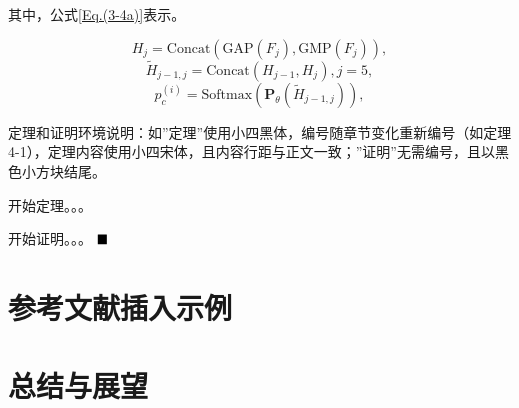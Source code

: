 其中，公式\ref{Eq.(3-4a)}表示。

\begin{equation}
	H_{j}= \mathrm{Concat}(\mathrm{GAP}({F}_{j}),\mathrm{GMP}({F}_{j})),
\end{equation}
\begin{equation}
	\tilde{H}_{j-1,j}= \mathrm{Concat}(H_{j-1},H_{j}),j=5,
\end{equation}
\begin{equation}
	p_c^{(i)}=\mathrm{Softmax}(\boldsymbol{P}_\theta(\tilde{H}_{j-1,j})),
\end{equation}

定理和证明环境说明：如”定理”使用小四黑体，编号随章节变化重新编号（如定理4-1），定理内容使用小四宋体，且内容行距与正文一致；”证明”无需编号，且以黑色小方块结尾。

\begin{theorem}\label{theorem1}
	\setlength{\baselineskip}{20pt}         %
	\renewcommand{\baselinestretch}{1.0}   %
	开始定理。。。
\end{theorem}

\begin{proof*} %
	\setlength{\baselineskip}{20pt}         %
	\renewcommand{\baselinestretch}{1.0}   %
	开始证明。。。
	$\hfill\blacksquare$ %
\end{proof*}

\clearpage

\section{参考文献插入示例}


\clearpage

\section{总结与展望}

